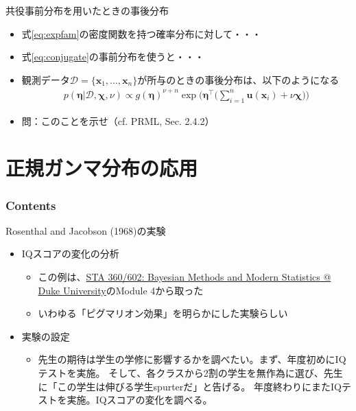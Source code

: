 \documentclass[aspectratio=169,unicode,dvipdfmx,14pt]{beamer}
\begin{document}
\begin{frame}{共役事前分布を用いたときの事後分布}
\begin{itemize}
\item 式\eqref{eq:expfam}の密度関数を持つ確率分布に対して・・・
\item 式\eqref{eq:conjugate}の事前分布を使うと・・・
\item 観測データ$\mathcal{D} = \{ \bm{x}_1, \ldots, \bm{x}_n \}$が所与のときの事後分布は、以下のようになる
\begin{align}
p(\bm{\eta}|\mathcal{D},\bm{\chi},\nu) \propto g(\bm{\eta})^{\nu+n}
\exp\bigg( \bm{\eta}^\intercal \bigg( \sum_{i=1}^n \bm{u}(\bm{x}_i) + \nu\bm{\chi} \bigg) \bigg)
\end{align}
\item 問：このことを示せ（cf. PRML, Sec. 2.4.2）
\end{itemize}
\end{frame}

\section{正規ガンマ分布の応用}

\begin{frame}\frametitle{Contents}
\Large \tableofcontents[currentsection]
\end{frame}

\begin{frame}{Rosenthal and Jacobson (1968)の実験}
\begin{itemize}
\item IQスコアの変化の分析
\begin{itemize}
\item この例は、\href{http://www2.stat.duke.edu/~rcs46/bayes17.html}{STA 360/602: Bayesian Methods and Modern Statistics @ Duke University}のModule 4から取った
\item いわゆる「ピグマリオン効果」を明らかにした実験らしい
\end{itemize}
\item 実験の設定
\begin{itemize}
\item 先生の期待は学生の学修に影響するかを調べたい。まず、年度初めにIQテストを実施。
そして、各クラスから2割の学生を無作為に選び、先生に「この学生は伸びる学生spurterだ」と告げる。
年度終わりにまたIQテストを実施。IQスコアの変化を調べる。
\end{itemize}
\end{itemize}
\end{frame}
\end{document}
